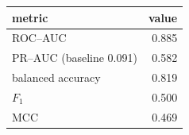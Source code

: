 \begin{tabular}{lr}
\toprule
metric & value \\
\midrule
ROC--AUC & 0.885 \\
PR--AUC (baseline 0.091) & 0.582 \\
balanced accuracy & 0.819 \\
$F_1$ & 0.500 \\
MCC & 0.469 \\
\bottomrule
\end{tabular}
